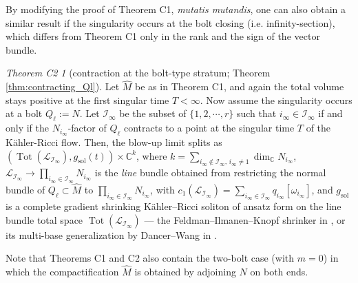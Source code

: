 \documentclass[11pt]{amsart}
\theoremstyle{plain}
\numberwithin{equation}{section}
\theoremstyle{definition}
\theoremstyle{remark}
\newtheorem*{thmC2}{Theorem C2}
\begin{document}
By modifying the proof of Theorem C1, \emph{mutatis mutandis}, one can also obtain a similar result if the singularity occurs at the bolt closing (i.e. infinity-section), which differs from Theorem C1 only in the rank and the sign of the vector bundle.

\begin{thmC2}[contraction at the bolt-type stratum; Theorem \ref{thm:contracting_Ql}]
Let $\widehat{M}$ be as in Theorem C1, and again the total volume stays positive at the first singular time $T < \infty$. Now assume the singularity occurs at a bolt $Q_\ell := N$. Let $\mathcal{I}_\infty$ be the subset of $\{1, 2, \cdots, r\}$ such that $i_\infty \in \mathcal{I}_\infty$ if and only if the $N_{i_\infty}$-factor of $Q_\ell$ contracts to a point at the singular time $T$ of the K\"ahler-Ricci flow. Then, the blow-up limit splits as $( \operatorname{Tot} ( \mathcal{L}_{\mathcal{I}_\infty} ), g_{\mathrm{sol}} ( t ) ) \times \mathbb{C}^k$, where $k = \sum_{i_\infty \not\in \mathcal{I}_\infty,\, i_\infty \not= 1} \dim_{\mathbb{C}} N_{i_\infty}$, $\mathcal{L}_{\mathcal{I}_\infty} \to \prod_{i_\infty \in \mathcal{I}_\infty} N_{i_\infty}$ is the \emph{line} bundle obtained from restricting the normal bundle of $Q_\ell \subset \widehat{M}$ to $\prod_{i_\infty \in \mathcal{I}_\infty} N_{i_\infty}$, with $c_1 ( \mathcal{L}_{\mathcal{I}_\infty} ) = \sum_{i_\infty\in \mathcal{I}_\infty} q_{i_\infty} [\omega_{i_\infty}]$, and $g_{\mathrm{sol}}$ is a complete gradient shrinking K\"ahler--Ricci soliton of ansatz form on the line bundle total space $\operatorname{Tot} ( \mathcal{L}_{\mathcal{I}_\infty} )$ --- the Feldman--Ilmanen--Knopf shrinker in \cite{FIK}, or its multi-base generalization by Dancer--Wang in \cite{DW2011}.

\end{thmC2}

Note that Theorems C1 and C2 also contain the two-bolt case (with $m = 0$) in which the compactification $\widehat{M}$ is obtained by adjoining $N$ on both ends.
\end{document}
